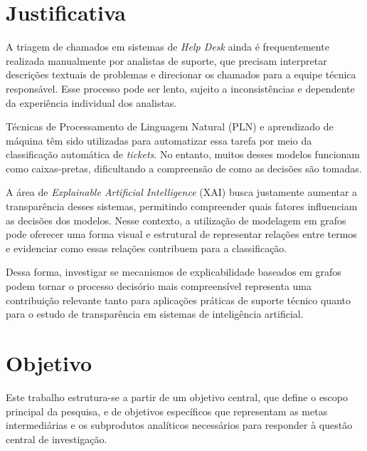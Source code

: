 \documentclass[
    12pt,                %
    openright,           %
    oneside,             %
    a4paper,             %
    english,             %
    brazil               %
]{abntex2}
\begin{document}

\section{Justificativa}
\label{sec:justificativa}

A triagem de chamados em sistemas de \textit{Help Desk} ainda é frequentemente realizada manualmente por analistas de suporte, que precisam interpretar descrições textuais de problemas e direcionar os chamados para a equipe técnica responsável. Esse processo pode ser lento, sujeito a inconsistências e dependente da experiência individual dos analistas.

Técnicas de Processamento de Linguagem Natural (PLN) e aprendizado de máquina têm sido utilizadas para automatizar essa tarefa por meio da classificação automática de \textit{tickets}. No entanto, muitos desses modelos funcionam como caixas-pretas, dificultando a compreensão de como as decisões são tomadas.

A área de \textit{Explainable Artificial Intelligence} (XAI) busca justamente aumentar a transparência desses sistemas, permitindo compreender quais fatores influenciam as decisões dos modelos. Nesse contexto, a utilização de modelagem em grafos pode oferecer uma forma visual e estrutural de representar relações entre termos e evidenciar como essas relações contribuem para a classificação.

Dessa forma, investigar se mecanismos de explicabilidade baseados em grafos podem tornar o processo decisório mais compreensível representa uma contribuição relevante tanto para aplicações práticas de suporte técnico quanto para o estudo de transparência em sistemas de inteligência artificial.

\section{Objetivo}
\label{sec:objetivo}

Este trabalho estrutura-se a partir de um objetivo central, que define o escopo principal da pesquisa, e de objetivos específicos que representam as metas intermediárias e os subprodutos analíticos necessários para responder à questão central de investigação.
\end{document}
